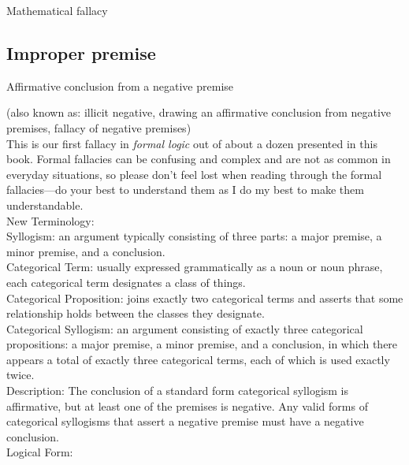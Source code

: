 \documentclass[a4paper,12pt,single,pdftex]{scrartcl}
\begin{document}
  

Mathematical fallacy\subsection{Improper premise}


Affirmative conclusion from a negative premise
    
      (also known as: illicit negative, drawing an affirmative conclusion from negative premises, fallacy of negative premises)
    \\

  
    
      This is our first fallacy in {\it formal logic} out of about a dozen presented in this book.  Formal fallacies can be confusing and complex and are not as common in everyday situations, so please don’t feel lost when reading through the formal fallacies—do your best to understand them as I do my best to make them understandable.
    \\

    
      New Terminology:
    \\

    
      Syllogism: an argument typically consisting of three parts: a major premise, a minor premise, and a conclusion.
    \\

    
      Categorical Term: usually expressed grammatically as a noun or noun phrase, each categorical term designates a class of things.
    \\

    
      Categorical Proposition: joins exactly two categorical terms and asserts that some relationship holds between the classes they designate.
    \\

    
      Categorical Syllogism: an argument consisting of exactly three categorical propositions: a major premise, a minor premise, and a conclusion, in which there appears a total of exactly three categorical terms, each of which is used exactly twice.
    \\

    
      Description: The conclusion of a standard form categorical syllogism is affirmative, but at least one of the premises is negative. Any valid forms of categorical syllogisms that assert a negative premise must have a negative conclusion.
    \\

    
      Logical Form:
    \\
\end{document}

